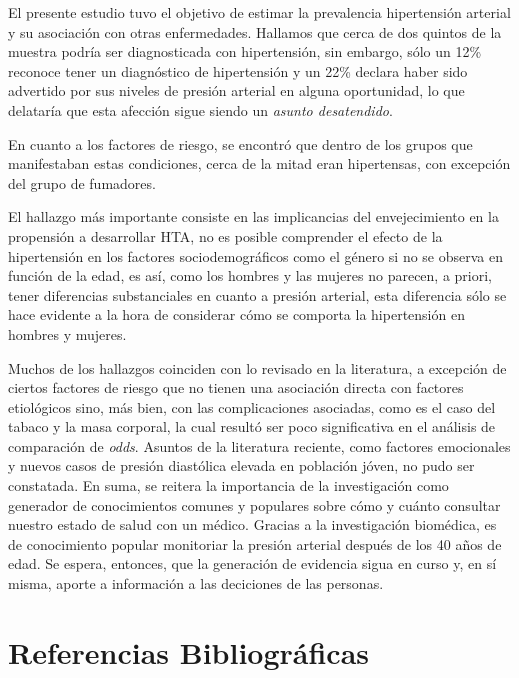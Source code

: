 \documentclass{aa}
\begin{document}
El presente estudio tuvo el objetivo de estimar la prevalencia hipertensión arterial y su asociación con otras enfermedades. Hallamos que cerca de dos quintos de la muestra podría ser diagnosticada con hipertensión, sin embargo, sólo un 12\% reconoce tener un diagnóstico de hipertensión y un 22\% declara haber sido advertido por sus niveles de presión arterial en alguna oportunidad, lo que delataría que esta afección sigue siendo un \textit{asunto desatendido}. 

En cuanto a los factores de riesgo, se encontró que dentro de los grupos que manifestaban estas condiciones, cerca de la mitad eran hipertensas, con excepción del grupo de fumadores. 

El hallazgo más importante consiste en las implicancias del envejecimiento en la propensión a desarrollar HTA, no es posible comprender el efecto de la hipertensión en los factores sociodemográficos como el género si no se observa en función de la edad, es así, como los hombres y las mujeres no parecen, a priori, tener diferencias substanciales en cuanto a presión arterial, esta diferencia sólo se hace evidente a la hora de considerar cómo se comporta la hipertensión en hombres y mujeres.

Muchos de los hallazgos coinciden con lo revisado en la literatura, a excepción de ciertos factores de riesgo que no tienen una asociación directa con factores etiológicos sino, más bien, con las complicaciones asociadas, como es el caso del tabaco y la masa corporal, la cual resultó ser poco significativa en el análisis de comparación de \textit{odds}. Asuntos de la literatura reciente, como factores emocionales y nuevos casos de presión diastólica elevada en población jóven, no pudo ser constatada. En suma, se reitera la importancia de la investigación como generador de conocimientos comunes y populares sobre cómo y cuánto consultar nuestro estado de salud con un médico. Gracias a la investigación biomédica, es de conocimiento popular monitoriar la presión arterial después de los 40 años de edad. Se espera, entonces, que la generación de evidencia sigua en curso y, en sí misma, aporte a información a las deciciones de las personas.




\section{Referencias Bibliográficas}
\end{document}
